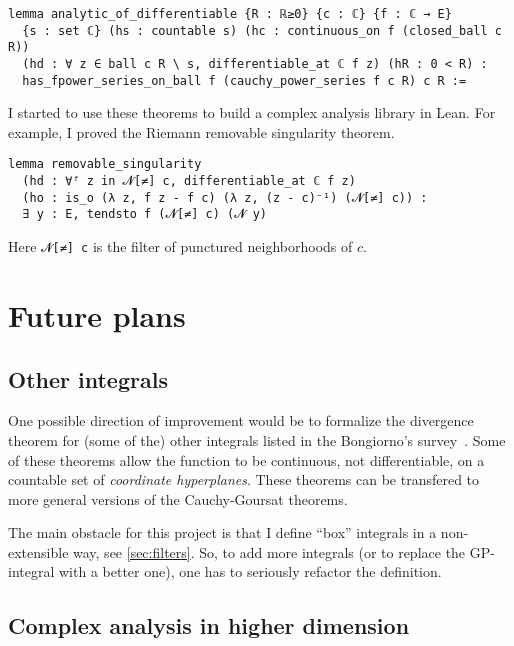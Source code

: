 \documentclass[a4paper, UKenglish,cleveref, autoref, thm-restate]{lipics-v2021}
\begin{document}
\begin{lstlisting}[caption=Analyticity of a complex differentiable function,label=lst:diff-analytic]
lemma analytic_of_differentiable {R : ℝ≥0} {c : ℂ} {f : ℂ → E}
  {s : set ℂ} (hs : countable s) (hc : continuous_on f (closed_ball c R))
  (hd : ∀ z ∈ ball c R \ s, differentiable_at ℂ f z) (hR : 0 < R) :
  has_fpower_series_on_ball f (cauchy_power_series f c R) c R :=
\end{lstlisting}

I started to use these theorems to build a complex analysis library in
Lean. For example, I proved the Riemann removable singularity theorem.

\begin{lstlisting}
lemma removable_singularity
  (hd : ∀ᶠ z in 𝓝[≠] c, differentiable_at ℂ f z)
  (ho : is_o (λ z, f z - f c) (λ z, (z - c)⁻¹) (𝓝[≠] c)) :
  ∃ y : E, tendsto f (𝓝[≠] c) (𝓝 y)
\end{lstlisting}

Here \lstinline{𝓝[≠] c} is the filter of punctured neighborhoods of
\(c\).

\section{Future plans}\label{sec:future-plans}

\subsection{Other integrals}\label{sec:other-integrals}

One possible direction of improvement would be to formalize the
divergence theorem for (some of the) other integrals listed in the
Bongiorno's survey~\cite{BONGIORNO2002587}. Some of these theorems
allow the function to be continuous, not differentiable, on a
countable set of \emph{coordinate hyperplanes}. These theorems can be
transfered to more general versions of the Cauchy-Goursat theorems.

The main obstacle for this project is that I define \enquote{box}
integrals in a non-extensible way, see \autoref{sec:filters}. So, to
add more integrals (or to replace the GP-integral with a better one),
one has to seriously refactor the definition.

\subsection{Complex analysis in higher dimension}%
\label{sec:compl-analys-high}
\end{document}
